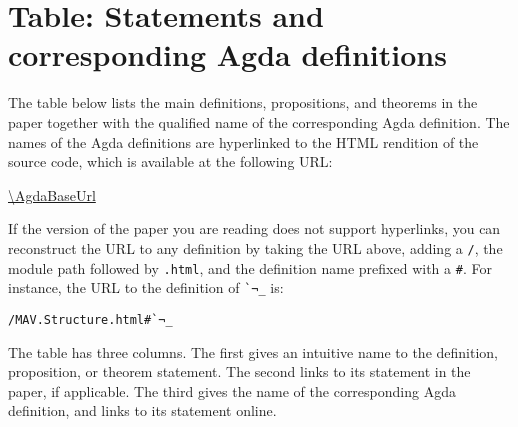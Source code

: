 \section{Table: Statements and corresponding Agda definitions}
\label{sec:table-of-statments}

The table below lists the main definitions, propositions, and theorems in the paper together with the qualified name of the corresponding Agda definition.
The names of the Agda definitions are hyperlinked to the HTML rendition of the source code, which is available at the following URL:
\begin{center}
  \url{\AgdaBaseUrl}
\end{center}
If the version of the paper you are reading does not support hyperlinks, you can reconstruct the URL to any definition by taking the URL above, adding a \texttt{/}, the module path followed by \texttt{.html}, and the definition name prefixed with a \texttt{\#}.
For instance, the URL to the definition of \texttt{\`{}¬\_} is:
\begin{center}
  \texttt{\AgdaBaseUrl/MAV.Structure.html\#\`{}¬\_}
\end{center}
The table has three columns.
The first gives an intuitive name to the definition, proposition, or theorem statement.
The second links to its statement in the paper, if applicable.
The third gives the name of the corresponding Agda definition, and links to its statement online.
